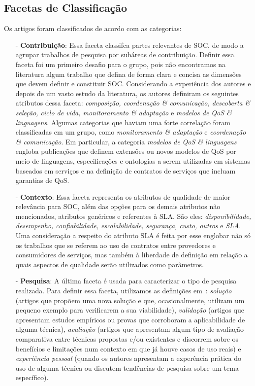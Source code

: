 \subsection{Facetas de Classificação}

Os artigos foram classificados de acordo com as categorias:
\begin{itemize}
\item[-] \textbf{Contribuição}: Essa faceta classifca partes relevantes de SOC, de modo a agrupar trabalhos de pesquisa por subáreas de contribuição. Definir essa faceta foi um primeiro desafio para o grupo, pois n\~{a}o encontramos na literatura algum trabalho que defina de forma clara e concisa as dimensões que devem definir e constituir SOC. Considerando a experi\^{e}ncia dos autores e depois de um vasto estudo da literatura, os autores definiram os seguintes atributos dessa faceta: \emph{composição, coordenação \& comunicação, descoberta \& seleção, ciclo de vida, monitoramento \& adaptação} e  \emph{modelos de QoS \& linguagens}. Algumas categorias que haviam uma forte correla\c{c}\~{a}o foram classificadas em um grupo, como  \emph{monitoramento \& adaptação} e \emph{coordenação \& comunicação}. Em particular, a categoria \emph{modelos de QoS \& linguagens} engloba publicações que definem extensões ou novos modelos de QoS por meio de linguagens, especificações e ontologias a serem utilizadas em sistemas baseados em serviços e na definição de contratos de serviços que incluam garantias de QoS.

\item[-] \textbf{Contexto}: Essa faceta representa os atributos de qualidade de maior relevância para SOC, além das opções para os demais atributos não mencionados, atributos genéricos e referentes à SLA. São eles: \emph{disponibilidade, desempenho, confiabilidade, escalabilidade, segurança, custo, outros} e \emph{SLA}. Uma consideração a respeito do atributo SLA é feita por esse englobar não só os trabalhos que se referem ao uso de contratos entre provedores e consumidores de serviços, mas também à liberdade de definição em relação a quais aspectos de qualidade serão utilizados como parâmetros.

\item[-] \textbf{Pesquisa}: A última faceta \'{e} usada para caracterizar o tipo de pesquisa realizada. Para definir essa faceta, utilizamos as defini\c{c}\~{o}es em~\cite{Wieringa:10.1007/s00766-005-0021-6}: 
\emph{solu\c c\~{a}o} (artigos que propõem uma nova solução e que, ocasionalmente, utilizam um pequeno exemplo para verificarem a sua viabilidade), \emph{validação} (artigos que apresentam 
estudos empíricos ou provas que corroboram a aplicabilidade de alguma t\'{e}cnica), \emph{avalia\c c\~{a}o} (artigos que apresentam 
algum tipo de avalia\c c\~{a}o comparativa entre t\'{e}cnicas propostas e/ou existentes e discorrem sobre os benefícios e limitações num contexto em que já houve casos de uso reais) e \emph{experiência pessoal} (quando os autores apresentam a exper\^{e}ncia pr\'{a}tica do uso de alguma t\'{e}cnica ou discutem tend\^{e}ncias de pesquisa sobre um tema espec\'{i}fico).
\end{itemize}


